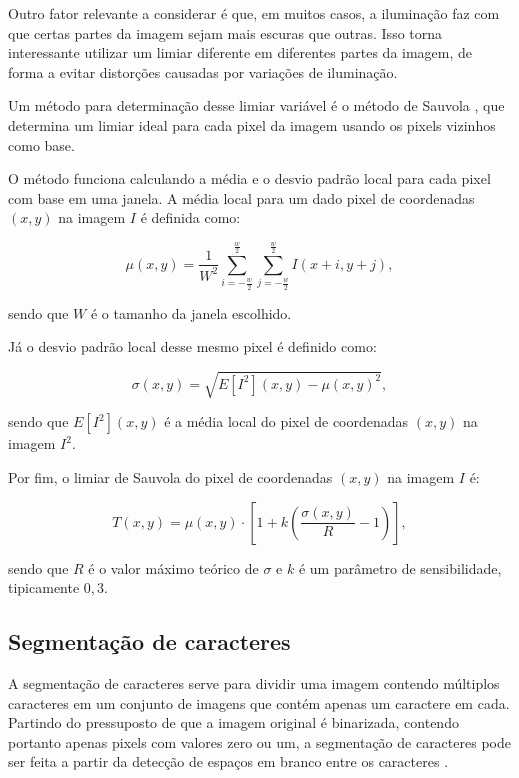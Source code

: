 Outro fator relevante a considerar é que, em muitos casos, a iluminação faz com que certas partes da imagem sejam mais escuras que outras. Isso torna interessante utilizar um limiar diferente em diferentes partes da imagem, de forma a evitar distorções causadas por variações de iluminação.

Um método para determinação desse limiar variável é o método de Sauvola \cite{sauvola}, que determina um limiar ideal para cada pixel da imagem usando os pixels vizinhos como base.

O método funciona calculando a média e o desvio padrão local para cada pixel com base em uma janela. A média local para um dado pixel de coordenadas $(x,y)$ na imagem $I$ é definida como:

\begin{equation}
    \mu (x,y) = \frac{1}{W^2} \sum_{i=-\frac{w}{2}}^{\frac{w}{2}} \sum_{j=-\frac{w}{2}}^{\frac{w}{2}} I(x+i,y+j),
\end{equation}

sendo que $W$ é o tamanho da janela escolhido.

Já o desvio padrão local desse mesmo pixel é definido como:

\begin{equation}
    \sigma (x,y) = \sqrt{E[I^2](x,y) - \mu (x,y)^2},
\end{equation}

sendo que $E[I^2](x,y)$ é a média local do pixel de coordenadas $(x,y)$ na imagem $I^2$.

Por fim, o limiar de Sauvola do pixel de coordenadas $(x,y)$ na imagem $I$ é:

\begin{equation}
    T(x,y) = \mu (x,y) \cdot \left[1 + k \left(\frac{\sigma (x,y)}{R} - 1\right)\right],
\end{equation}

sendo que $R$ é o valor máximo teórico de $\sigma$ e $k$ é um parâmetro de sensibilidade, tipicamente $0{,}3$.

\subsection{Segmentação de caracteres}

A segmentação de caracteres serve para dividir uma imagem contendo múltiplos caracteres em um conjunto de imagens que contém apenas um caractere em cada. Partindo do pressuposto de que a imagem original é binarizada, contendo portanto apenas pixels com valores zero ou um, a segmentação de caracteres pode ser feita a partir da detecção de espaços em branco entre os caracteres \cite{caractere-sep}.

